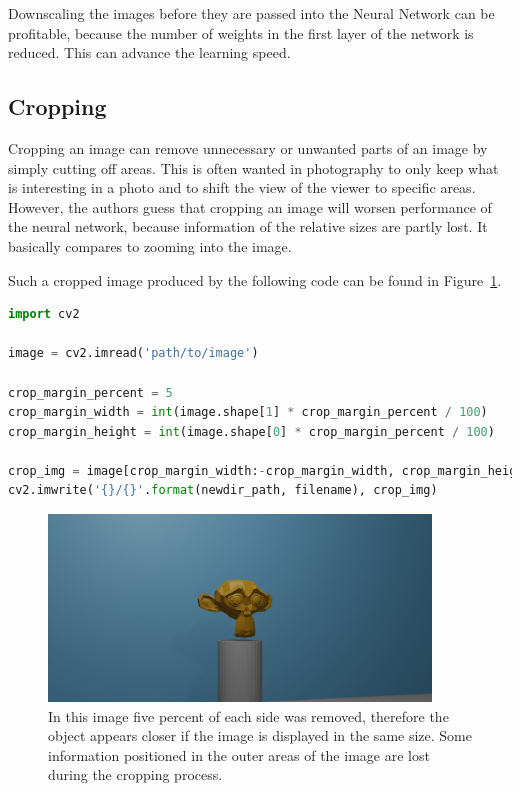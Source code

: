 Downscaling the images before they are passed into the Neural Network can be profitable, because the number of weights in the first layer of the network is reduced. This can advance the learning speed.

\subsection{Cropping}
Cropping an image can remove unnecessary or unwanted parts of an image by simply cutting off areas. This is often wanted in photography to only keep what is interesting in a photo and to shift the view of the viewer to specific areas. However, the authors guess that cropping an image will worsen performance of the neural network, because information of the relative sizes are partly lost. It basically compares to zooming into the image.

Such a cropped image produced by the following code can be found in Figure~\ref{pic:implementation_opencv_cropping}.

\begin{lstlisting}[language=python]
import cv2

image = cv2.imread('path/to/image')

crop_margin_percent = 5
crop_margin_width = int(image.shape[1] * crop_margin_percent / 100)
crop_margin_height = int(image.shape[0] * crop_margin_percent / 100)

crop_img = image[crop_margin_width:-crop_margin_width, crop_margin_height:-crop_margin_height]
cv2.imwrite('{}/{}'.format(newdir_path, filename), crop_img)
\end{lstlisting}

\begin{figure}[h!]
	\centering
	\includegraphics[width=4in]{img/implementation_opencv_cropping.jpg}
	\caption{In this image five percent of each side was removed, therefore the object appears closer if the image is displayed in the same size. Some information positioned in the outer areas of the image are lost during the cropping process.}
	\label{pic:implementation_opencv_cropping}
\end{figure}

